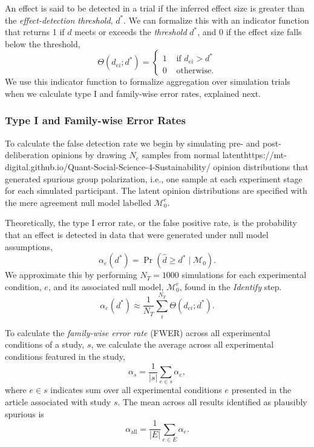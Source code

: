 \documentclass[preview]{article}
\newcommand{\nullmodel}{\mathcal{M}_0}
\begin{document}
An effect is said to be detected in a trial if the inferred 
effect size is greater than the \emph{effect-detection threshold}, $d^*$. We can
formalize this with an indicator function that returns 1 if $d$ meets or exceeds the
\emph{threshold} $d^*$, and 0 if the effect size falls below the threshold,
\begin{equation}
  \Theta(d_{ei}; d^*) = 
    \begin{cases}
      1 & \text{ if } d_{ei} > d^* \\
      0 & \text{ otherwise.}
    \end{cases}
  \label{eq:threshold-indicator}
\end{equation} 
\noindent
We use this indicator function to formalize aggregation over simulation trials when
we calculate type I and family-wise error rates, explained next.


\subsubsection{Type I and Family-wise Error Rates}\label{false-positive-rate}

To calculate the false detection rate we begin by simulating pre- and
post-deliberation opinions by drawing $N_e$ samples from normal latenthttps://mt-digital.github.io/Quant-Social-Science-4-Sustainability/
opinion distributions that generated spurious group polarization, i.e.,
one sample at each experiment stage for each simulated participant. The
latent opinion distributions are specified with the mere agreement null
model labelled $\nullmodel^e$.

Theoretically, the type I error rate, or the false positive rate, is the probability
that an effect is detected in data that were generated under null model assumptions,
\begin{equation}
  \alpha_e(d^*) = \Pr\!\left( \hat{d} \ge d^{*} \mid \mathcal{M}_{0} \right).
  \label{eq:false-positive-rate-theory}
\end{equation}
\noindent
We approximate this by performing $N_T=1000$ simulations for each experimental 
condition, $e$, and its associated null model, $\nullmodel^e$, found in the
\emph{Identify} step.
\begin{equation}
  \alpha_e(d^*) \approx \frac{1}{N_T} \sum_i^{N_T} \Theta(d_{ei}; d^*).
  \label{eq:false-positive-rate-calculation}
\end{equation}

To calculate the \emph{family-wise error rate} (FWER) across all experimental
conditions of a study, $s$, we calculate the average across all experimental
conditions featured in the study,
\begin{equation}
\alpha_s = \frac{1}{|s|} \sum_{e \in s} \alpha_e,
  \label{eq:fwer-study}
\end{equation}
where $e \in s$ indicates sum over all experimental conditions
$e$ presented in the article associated with study $s$. The mean
across all results identified as plausibly spurious is 
\begin{equation}
 \alpha_\mathrm{all} = \frac{1}{|E|} \sum_{e \in E} \alpha_e.
\end{equation}
\end{document}
